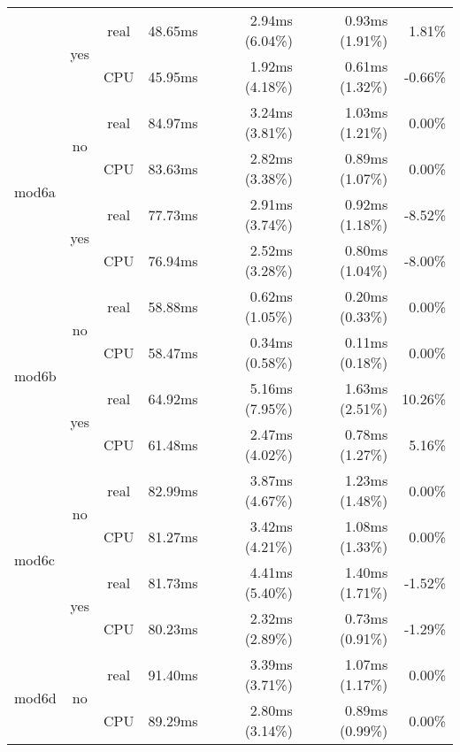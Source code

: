 \documentclass[en]{pracamgr}
\begin{document}
\begin{appendices}
\begin{small}
\begin{longtable}{|l|c|c|r|r|r|r|}
                          \cline{2-7}
                          & \multirow{2}{*}{yes} & real & 48.65ms & 2.94ms (6.04\%) & 0.93ms (1.91\%) & 1.81\% \\*
                          &                      & CPU  & 45.95ms & 1.92ms (4.18\%) & 0.61ms (1.32\%) & -0.66\% \\
\hline
\multirow{4}{*}{mod6a}    & \multirow{2}{*}{no}  & real & 84.97ms & 3.24ms (3.81\%) & 1.03ms (1.21\%) & 0.00\% \\*
                          &                      & CPU  & 83.63ms & 2.82ms (3.38\%) & 0.89ms (1.07\%) & 0.00\% \\*
                          \cline{2-7}
                          & \multirow{2}{*}{yes} & real & 77.73ms & 2.91ms (3.74\%) & 0.92ms (1.18\%) & -8.52\% \\*
                          &                      & CPU  & 76.94ms & 2.52ms (3.28\%) & 0.80ms (1.04\%) & -8.00\% \\
\hline
\multirow{4}{*}{mod6b}    & \multirow{2}{*}{no}  & real & 58.88ms & 0.62ms (1.05\%) & 0.20ms (0.33\%) & 0.00\% \\*
                          &                      & CPU  & 58.47ms & 0.34ms (0.58\%) & 0.11ms (0.18\%) & 0.00\% \\*
                          \cline{2-7}
                          & \multirow{2}{*}{yes} & real & 64.92ms & 5.16ms (7.95\%) & 1.63ms (2.51\%) & 10.26\% \\*
                          &                      & CPU  & 61.48ms & 2.47ms (4.02\%) & 0.78ms (1.27\%) & 5.16\% \\
\hline
\multirow{4}{*}{mod6c}    & \multirow{2}{*}{no}  & real & 82.99ms & 3.87ms (4.67\%) & 1.23ms (1.48\%) & 0.00\% \\*
                          &                      & CPU  & 81.27ms & 3.42ms (4.21\%) & 1.08ms (1.33\%) & 0.00\% \\*
                          \cline{2-7}
                          & \multirow{2}{*}{yes} & real & 81.73ms & 4.41ms (5.40\%) & 1.40ms (1.71\%) & -1.52\% \\*
                          &                      & CPU  & 80.23ms & 2.32ms (2.89\%) & 0.73ms (0.91\%) & -1.29\% \\
\hline
\multirow{4}{*}{mod6d}    & \multirow{2}{*}{no}  & real & 91.40ms & 3.39ms (3.71\%) & 1.07ms (1.17\%) & 0.00\% \\*
                          &                      & CPU  & 89.29ms & 2.80ms (3.14\%) & 0.89ms (0.99\%) & 0.00\% \\*

\end{longtable}
\end{small}
\end{appendices}
\end{document}
